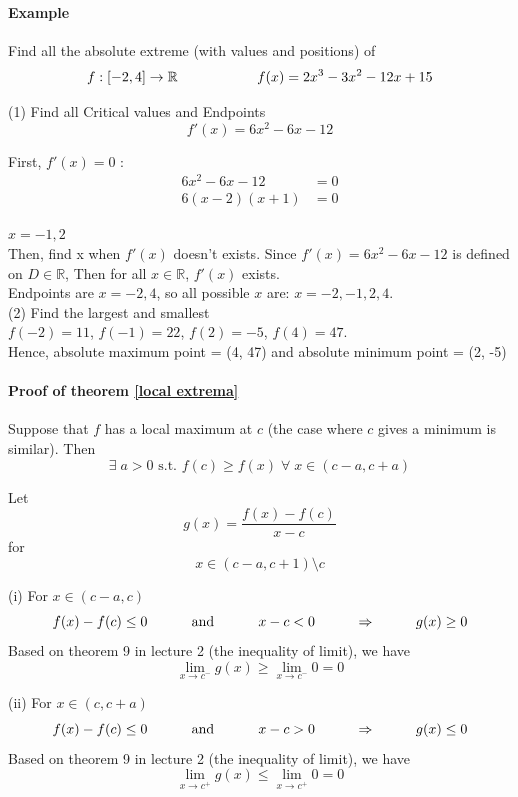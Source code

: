 \documentclass[12pt]{article}
\newcommand\tab[1][1cm]{\hspace*{#1}}
\begin{document}
\paragraph{Example} Find all the absolute extreme (with values and positions) of
\[
    f : [ -2,4] \to \mathbb{R} \textrm{\tab \tab} f(x) = 2x^3 - 3x^2 - 12x + 15
\]

\noindent
(1) Find all Critical values and Endpoints
\[
    f'(x) = 6x^2 - 6x - 12
\]


First, $f'(x) = 0$ :
\begin{align*} 
    6x^2 - 6x - 12 &= 0 \\
    6(x - 2)(x + 1) &= 0
\end{align*}

$x = {-1, 2}$ \\

Then, find x when $f'(x)$ doesn't exists. Since $f'(x) = 6x^2 - 6x - 12$ is defined on $D \in \mathbb{R}$, Then
for all $x \in \mathbb{R}$,  $f'(x)$ exists. \\

Endpoints are $x = {-2, 4}$, so all possible $x$ are: $x = {-2, -1, 2, 4}$. \\

\noindent
(2) Find the largest and smallest \\
$f(-2) = 11$, $f(-1) = 22$, $f(2) = -5$, $f(4) = 47$.\\
Hence, absolute maximum point = (4, 47) and absolute minimum point = (2, -5) 

\paragraph{Proof of theorem \ref{local extrema}}
Suppose that $f$ has a local maximum at $c$ (the case where  $c$ gives a minimum is  similar).
Then 
\[ 
    \exists \; a > 0\textrm{ s.t. } f(c) \geq f(x) \;  \forall \; x \in (c - a, c + a)
\]

\noindent
Let
\[
    g(x) = \frac{f(x) - f(c)}{x - c} 
\]
for 
\[
    x \in (c - a, c + 1) \setminus {c} 
\]

(i) For $x \in (c - a, c)$ 
\[
    f(x) - f(c) \leq 0 \textrm{ \tab and \tab} x - c < 0 \textrm{\tab} \Rightarrow \textrm{\tab} g(x) \geq 0
\]
Based on theorem 9 in lecture 2 (the inequality of limit), we have
\[
    \lim_{x \to c^{ -}} g(x) \geq \lim_{x \to c^{ - }} 0 = 0
\]

(ii) For $x \in (c, c + a)$ 
\[
    f(x) - f(c) \leq  0 \textrm{ \tab and \tab} x - c > 0 \textrm{\tab} \Rightarrow \textrm{\tab} g(x) \leq  0
\]
Based on theorem 9 in lecture 2 (the inequality of limit), we have
\[
    \lim_{x \to c^{ + }} g(x) \leq  \lim_{x \to c^{ + }} 0 = 0
\]
\end{document}
